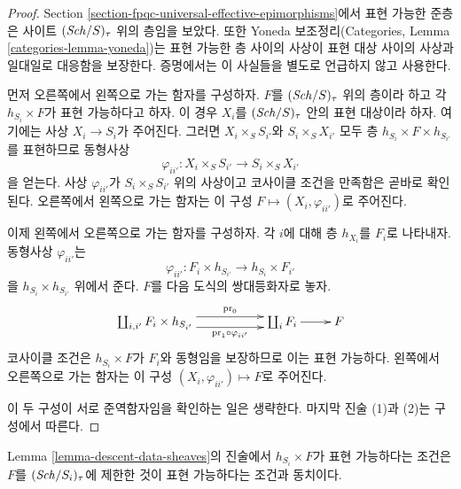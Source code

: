 \begin{proof}
Section \ref{section-fpqc-universal-effective-epimorphisms}에서 표현 가능한
준층은 사이트 $(\mathit{Sch}/S)_\tau$ 위의 층임을 보았다. 또한 Yoneda
보조정리(Categories, Lemma \ref{categories-lemma-yoneda})는 표현 가능한
층 사이의 사상이 표현 대상 사이의 사상과 일대일로 대응함을 보장한다.
증명에서는 이 사실들을 별도로 언급하지 않고 사용한다.

\medskip\noindent
먼저 오른쪽에서 왼쪽으로 가는 함자를 구성하자. $F$를
$(\mathit{Sch}/S)_\tau$ 위의 층이라 하고 각 $h_{S_i} \times F$가 표현
가능하다고 하자. 이 경우 $X_i$를 $(\mathit{Sch}/S)_\tau$ 안의 표현 대상이라
하자. 여기에는 사상 $X_i \to S_i$가 주어진다. 그러면
$X_i \times_S S_{i'}$와 $S_i \times_S X_{i'}$ 모두 층
$h_{S_i} \times F \times h_{S_{i'}}$를 표현하므로 동형사상
$$
\varphi_{ii'} : X_i \times_S S_{i'} \to S_i \times_S X_{i'}
$$
을 얻는다. 사상 $\varphi_{ii'}$가 $S_i \times_S S_{i'}$ 위의 사상이고
코사이클 조건을 만족함은 곧바로 확인된다. 오른쪽에서 왼쪽으로 가는
함자는 이 구성 $F \mapsto (X_i, \varphi_{ii'})$로 주어진다.

\medskip\noindent
이제 왼쪽에서 오른쪽으로 가는 함자를 구성하자. 각 $i$에 대해 층
$h_{X_i}$를 $F_i$로 나타내자. 동형사상 $\varphi_{ii'}$는
$$
\varphi_{ii'} :
F_i \times h_{S_{i'}}
\longrightarrow
h_{S_i} \times F_{i'}
$$
을 $h_{S_i} \times h_{S_{i'}}$ 위에서 준다. $F$를 다음 도식의
쌍대등화자로 놓자.
$$
\xymatrix{
\coprod_{i, i'} F_i \times h_{S_{i'}}
\ar@<1ex>[rr]^-{\text{pr}_0}
\ar@<-1ex>[rr]_-{\text{pr}_1 \circ \varphi_{ii'}}
& &
\coprod_i F_i \ar[r]
&
F
}
$$
코사이클 조건은 $h_{S_i} \times F$가 $F_i$와 동형임을 보장하므로 이는
표현 가능하다. 왼쪽에서 오른쪽으로 가는 함자는 이 구성
$(X_i, \varphi_{ii'}) \mapsto F$로 주어진다.

\medskip\noindent
이 두 구성이 서로 준역함자임을 확인하는 일은 생략한다. 마지막 진술
(1)과 (2)는 구성에서 따른다.
\end{proof}

\begin{remark}
\label{remark-what-product-means}
Lemma \ref{lemma-descent-data-sheaves}의 진술에서 $h_{S_i} \times F$가
표현 가능하다는 조건은 $F$를 $(\mathit{Sch}/S_i)_\tau$에 제한한 것이 표현
가능하다는 조건과 동치이다.
\end{remark}























